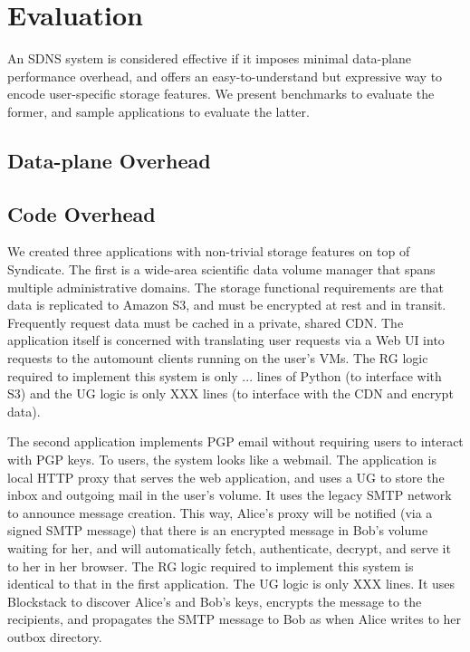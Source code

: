 \section{Evaluation}

An SDNS system is considered effective if it imposes minimal data-plane
performance overhead, and offers an easy-to-understand but expressive way to
encode user-specific storage features. We present benchmarks to evaluate the
former, and sample applications to evaluate the latter.

\subsection{Data-plane Overhead}

\subsection{Code Overhead}

We created three applications with non-trivial storage features on top of
Syndicate. The first is a wide-area scientific data volume manager that spans
multiple administrative domains. The storage functional requirements are that
data is replicated to Amazon S3, and must be encrypted at rest and in transit.
Frequently request data must be cached in a private, shared CDN. The application
itself is concerned with translating user requests via a Web UI into requests to
the automount clients running on the user's VMs. The RG logic required to
implement this system is only ... lines of Python (to interface with S3) and the
UG logic is only XXX lines (to interface with the CDN and encrypt data).

The second application implements PGP email without requiring users to interact
with PGP keys. To users, the system looks like a webmail. The application is
local HTTP proxy that serves the web application, and uses a UG to store the
inbox and outgoing mail in the user's volume. It uses the legacy SMTP
network to announce message creation. This way, Alice's proxy will be
notified (via a signed SMTP message) that there is an encrypted message in
Bob's volume waiting for her, and will automatically fetch, authenticate,
decrypt, and serve it to her in her browser. The RG logic required to implement
this system is identical to that in the first application. The UG logic is only
XXX lines. It uses Blockstack to discover Alice's and Bob's keys,
encrypts the message to the recipients, and propagates the SMTP message to Bob
as when Alice writes to her outbox directory.

